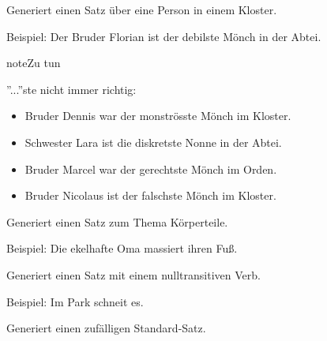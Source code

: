 \documentclass[a4paper,12pt,oneside]{sphinxmanual}
\begin{document}
\begin{fulllineitems}
\label{funktionen:pyzufall.satz_kloster}
Generiert einen Satz über eine Person in einem Kloster.

Beispiel: Der Bruder Florian ist der debilste Mönch in der Abtei.

\begin{notice}{note}{Zu tun}

''...''ste nicht immer richtig:
\begin{itemize}
\item {} 
Bruder Dennis war der monströsste Mönch im Kloster.

\item {} 
Schwester Lara ist die diskretste Nonne in der Abtei.

\item {} 
Bruder Marcel war der gerechtste Mönch im Orden.

\item {} 
Bruder Nicolaus ist der falschste Mönch im Kloster.

\end{itemize}
\end{notice}

\end{fulllineitems}


\begin{fulllineitems}
\label{funktionen:pyzufall.satz_koerperteil}
Generiert einen Satz zum Thema Körperteile.

Beispiel: Die ekelhafte Oma massiert ihren Fuß.

\end{fulllineitems}


\begin{fulllineitems}
\label{funktionen:pyzufall.satz_nulltransitiv}
Generiert einen Satz mit einem nulltransitiven Verb.

Beispiel: Im Park schneit es.

\end{fulllineitems}


\begin{fulllineitems}
\label{funktionen:pyzufall.satz_standard}
Generiert einen zufälligen Standard-Satz.

\end{fulllineitems}
\end{document}
